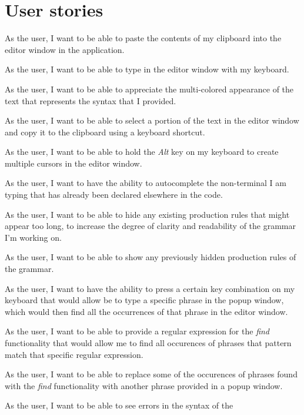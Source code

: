 \documentclass[english,engineering]{wizthesis}
\begin{document}
\section{User stories}

\begin{description}[align=left,leftmargin=4em,style=multiline]
  \item[US1] As the user, I want to be able to paste the contents of my
  clipboard into the editor window in the application.
  \item[US2] As the user, I want to be able to type in the editor window with
  my keyboard.
  \item[US3] As the user, I want to be able to appreciate the multi-colored
  appearance of the text that represents the syntax that I provided.
  \item[US4] As the user, I want to be able to select a portion of the text in
  the editor window and copy it to the clipboard using a keyboard shortcut.
  \item[US5] As the user, I want to be able to hold the \emph{Alt} key on my
  keyboard to create multiple cursors in the editor window.
  \item[US6] As the user, I want to have the ability to autocomplete the
  non-terminal I am typing that has already been declared elsewhere in the code.
  \item[US7] As the user, I want to be able to hide any existing production
  rules that might appear too long, to increase the degree of clarity and
  readability of the grammar I'm working on.
  \item[US8] As the user, I want to be able to show any previously hidden
  production rules of the grammar.
  \item[US9] As the user, I want to have the ability to press a certain key
  combination on my keyboard that would allow be to type a specific phrase
  in the popup window, which would then find all the occurrences of that phrase
  in the editor window.
  \item[US10] As the user, I want to be able to provide a regular expression
  for the \emph{find} functionality that would allow me to find all occurences
  of phrases that pattern match that specific regular expression. 
  \item[US11] As the user, I want to be able to replace some of the occurences
  of phrases found with the \emph{find} functionality with another phrase
  provided in a popup window.
  \item[US12] As the user, I want to be able to see errors in the syntax of the

\end{description}
\end{document}
